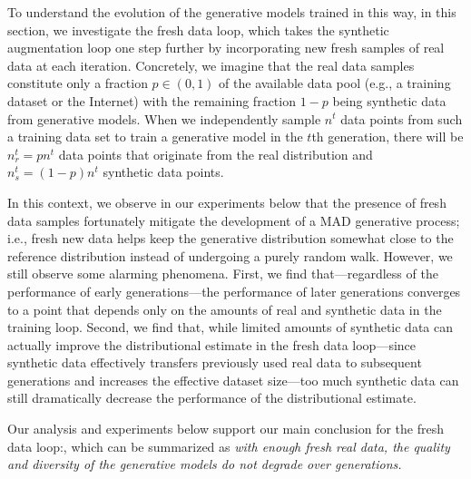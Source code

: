 \documentclass{article}
\def\colorMixed{colorB}
\def\colorFresh{colorC}
\def\mixed{\textcolor{\colorMixed}{synthetic augmentation loop}}
\def\fresh{\textcolor{\colorFresh}{fresh data loop}}
\newcommand\ali[1]{{\small\color{DarkGreen}\sf{[ali: #1]}}}
\begin{document}
To understand the evolution of the generative models trained in this way, in this section, we investigate the \fresh{}, which takes the \mixed{} one step further by incorporating new fresh samples of real data at each iteration. 
Concretely, we imagine that the real data samples constitute only a fraction $p \in (0, 1)$ of the available data pool (e.g., a training dataset or the Internet) with the remaining fraction $1 - p$ being synthetic data from generative models. 
When we independently sample $n^t$ data points from such a training data set to train a generative model in the $t$th generation, there will be $n_r^t = p n^t$ data points that originate from the real distribution and $n_s^t = (1 - p) n^t$ synthetic data points.

In this context, we observe in our experiments below that the presence of fresh data samples fortunately mitigate the development of a MAD generative process; i.e., fresh new data helps keep the generative distribution somewhat close to the reference distribution instead of undergoing a purely random walk.
However, we still observe some alarming phenomena. 
First, we find that---regardless of the performance of early generations---the performance of later generations converges to a point that depends only on the amounts of real and synthetic data in the training loop. 
Second, we find that, while limited amounts of synthetic data can actually improve the distributional estimate in the \fresh{}---since synthetic data effectively transfers previously used real data to subsequent generations and increases the effective dataset size---too much synthetic data can still dramatically decrease the performance of the distributional estimate.


Our analysis and experiments below support our main conclusion for the \fresh{}:, which can be summarized as {\em with enough fresh real data, the quality and diversity of the generative models do not degrade over generations.}
\end{document}
